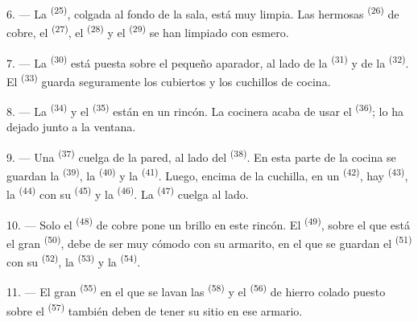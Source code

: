 \VUsaut{4.0mm}
\VUsaut{3.0mm}

6. --- La  \textsuperscript{(25)}, colgada al fondo de la
sala, está muy limpia. Las hermosas  \textsuperscript{(26)} de
cobre, el  \textsuperscript{(27)}, el  \textsuperscript{(28)}
y
el  \textsuperscript{(29)} se han limpiado con esmero.

7. --- La  \textsuperscript{(30)} está puesta sobre el pequeño
aparador, al lado de la  \textsuperscript{(31)} y de la
 \textsuperscript{(32)}. El 
\textsuperscript{(33)} guarda seguramente los cubiertos y los cuchillos de cocina.

8. --- La  \textsuperscript{(34)} y el  \textsuperscript{(35)}
están en un rincón. La cocinera acaba de usar el 
\textsuperscript{(36)}; lo ha dejado junto a la ventana.

9. --- Una  \textsuperscript{(37)} cuelga de la pared, al
lado del  \textsuperscript{(38)}. En esta parte de la cocina se
guardan la  \textsuperscript{(39)}, la 
\textsuperscript{(40)} y la  \textsuperscript{(41)}. Luego, encima
de la cuchilla, en un  \textsuperscript{(42)}, hay 
\textsuperscript{(43)}, la  \textsuperscript{(44)} con su 
\textsuperscript{(45)} y la  \textsuperscript{(46)}. La 
\textsuperscript{(47)} cuelga al lado.

10. --- Solo el  \textsuperscript{(48)} de cobre pone un brillo en este
rincón. El  \textsuperscript{(49)}, sobre el que está el gran
 \textsuperscript{(50)}, debe de ser muy cómodo con su armarito, en
el que se guardan el  \textsuperscript{(51)} con su
 \textsuperscript{(52)}, la  \textsuperscript{(53)} y
la  \textsuperscript{(54)}.

\VUsaut{4.0mm}
\VUsaut{3.0mm}

11. --- El gran  \textsuperscript{(55)} en el que se lavan las
 \textsuperscript{(58)} y el  \textsuperscript{(56)} de
hierro colado puesto sobre el  \textsuperscript{(57)} también
deben de tener su sitio en ese armario.

